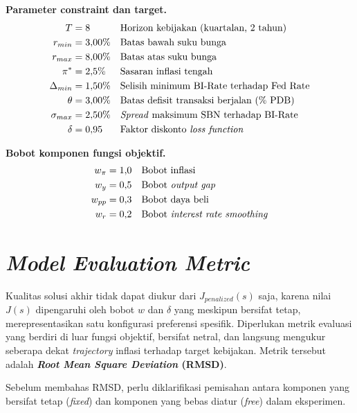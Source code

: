 \medskip
\noindent\textbf{Parameter constraint dan target.}
\begin{align*}
    T            & = 8        &  & \text{Horizon kebijakan (kuartalan, 2 tahun)}        \\
    r_{min}      & = 3{,}00\% &  & \text{Batas bawah suku bunga}                        \\
    r_{max}      & = 8{,}00\% &  & \text{Batas atas suku bunga}                         \\
    \pi^{*}      & = 2{,}5\%  &  & \text{Sasaran inflasi tengah}                        \\
    \Delta_{min} & = 1{,}50\% &  & \text{Selisih minimum BI-Rate terhadap Fed Rate}     \\
    \theta       & = 3{,}00\% &  & \text{Batas defisit transaksi berjalan (\% PDB)}     \\
    \sigma_{max} & = 2{,}50\% &  & \text{\textit{Spread} maksimum SBN terhadap BI-Rate} \\
    \delta       & = 0{,}95   &  & \text{Faktor diskonto \textit{loss function}}
\end{align*}

\medskip
\noindent\textbf{Bobot komponen fungsi objektif.}
\begin{align*}
    w_{\pi} & = 1{,}0 &  & \text{Bobot inflasi}                          \\
    w_{y}   & = 0{,}5 &  & \text{Bobot \textit{output gap}}              \\
    w_{pp}  & = 0{,}3 &  & \text{Bobot daya beli}                        \\
    w_{r}   & = 0{,}2 &  & \text{Bobot \textit{interest rate smoothing}}
\end{align*}

\section{\textit{Model Evaluation Metric}}

Kualitas solusi akhir tidak dapat diukur dari $J_{penalized}(s)$ saja, karena nilai $J(s)$ dipengaruhi oleh bobot $w$ dan $\delta$ yang meskipun bersifat tetap, merepresentasikan satu konfigurasi preferensi spesifik. Diperlukan metrik evaluasi yang berdiri di luar fungsi objektif, bersifat netral, dan langsung mengukur seberapa dekat \textit{trajectory} inflasi terhadap target kebijakan. Metrik tersebut adalah \textbf{\textit{Root Mean Square Deviation} (RMSD)}.

Sebelum membahas RMSD, perlu diklarifikasi pemisahan antara komponen yang bersifat tetap (\textit{fixed}) dan komponen yang bebas diatur (\textit{free}) dalam eksperimen.

